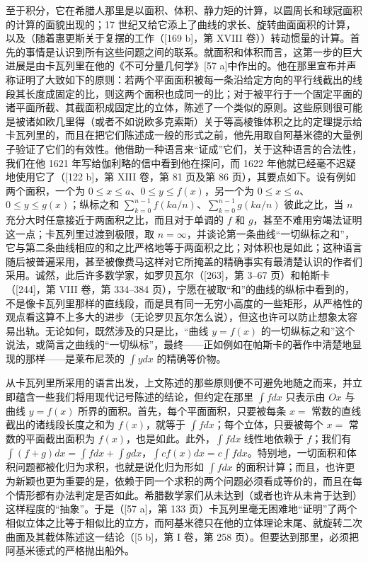 至于积分，它在希腊人那里是以面积、体积、静力矩的计算，以圆周长和球冠面积的计算的面貌出现的；17 世纪又给它添上了曲线的求长、旋转曲面面积的计算，以及（随着惠更斯关于复摆的工作（{[}169 b{]}，第 XVIII 卷））转动惯量的计算。首先的事情是认识到所有这些问题之间的联系。就面积和体积而言，这第一步的巨大进展是由卡瓦列里在他的《不可分量几何学》{[}57 a{]}中作出的。他在那里宣布并声称证明了大致如下的原则：若两个平面面积被每一条沿给定方向的平行线截出的线段其长度成固定的比，则这两个面积也成同一的比；对于被平行于一个固定平面的诸平面所截、其截面积成固定比的立体，陈述了一个类似的原则。这些原则很可能是被诸如欧几里得（或者不如说欧多克索斯）关于等高棱锥体积之比的定理提示给卡瓦列里的，而且在把它们陈述成一般的形式之前，他先用取自阿基米德的大量例子验证了它们的有效性。他借助一种语言来“证成”它们，关于这种语言的合法性，我们在他 1621 年写给伽利略的信中看到他在探问，而 1622 年他就已经毫不迟疑地使用它了（{[}122 b{]}，第 XIII 卷，第 81 页及第 86 页），其要点如下。设有例如两个面积，一个为 \(0 \leq x \leq a\)、\(0 \leq y \leq f(x)\)，另一个为 \(0 \leq x \leq a\)、\(0 \leq y \leq g(x)\)；纵标之和 \(\sum_{k=0}^{n-1} f(ka/n)\)、\(\sum_{k=0}^{n-1} g(ka/n)\) 彼此之比，当 \(n\) 充分大时任意接近于两面积之比，而且对于单调的 \(f\) 和 \(g\)，甚至不难用穷竭法证明这一点；卡瓦列里过渡到极限，取 \(n = \infty\)，并谈论第一条曲线“一切纵标之和”，它与第二条曲线相应的和之比严格地等于两面积之比；对体积也是如此；这种语言随后被普遍采用，甚至被像费马这样对它所掩盖的精确事实有最清楚认识的作者们采用。诚然，此后许多数学家，如罗贝瓦尔（{[}263{]}，第 3–67 页）和帕斯卡（{[}244{]}，第 VIII 卷，第 334–384 页），宁愿在被取“和”的曲线的纵标中看到的，不是像卡瓦列里那样的直线段，而是具有同一无穷小高度的一些矩形，从严格性的观点看这算不上多大的进步（无论罗贝瓦尔怎么说），但这也许可以防止想象太容易出轨。无论如何，既然涉及的只是比，“曲线 \(y = f(x)\) 的一切纵标之和”这个说法，或简言之曲线的“一切纵标”，最终——正如例如在帕斯卡的著作中清楚地显现的那样——是莱布尼茨的 \(\int ydx\) 的精确等价物。

从卡瓦列里所采用的语言出发，上文陈述的那些原则便不可避免地随之而来，并立即蕴含一些我们将用现代记号陈述的结论，但约定在那里 \(\int f dx\) 只表示由 \(Ox\) 与曲线 \(y = f(x)\) 所界的面积。首先，每个平面面积，只要被每条 \(x =\) 常数的直线截出的诸线段长度之和为 \(f(x)\)，就等于 \(\int f dx\)；每个立体，只要被每个 \(x =\) 常数的平面截出面积为 \(f(x)\)，也是如此。此外，\(\int f dx\) 线性地依赖于 \(f\)；我们有 \(\int (f + g)dx = \int f dx + \int g dx\)，\(\int cf(x)dx = c\int f dx\)。特别地，一切面积和体积问题都被化归为求积，也就是说化归为形如 \(\int f dx\) 的面积计算；而且，也许更为新颖也更为重要的是，依赖于同一个求积的两个问题必须看成等价的，而且在每个情形都有办法判定是否如此。希腊数学家们从未达到（或者也许从未肯于达到）这样程度的“抽象”。于是（{[}57 a{]}，第 133 页）卡瓦列里毫无困难地“证明”了两个相似立体之比等于相似比的立方，而阿基米德只在他的立体理论末尾、就旋转二次曲面及其截体陈述这一结论（{[}5 b{]}，第 I 卷，第 258 页）。但要达到那里，必须把阿基米德式的严格抛出船外。

